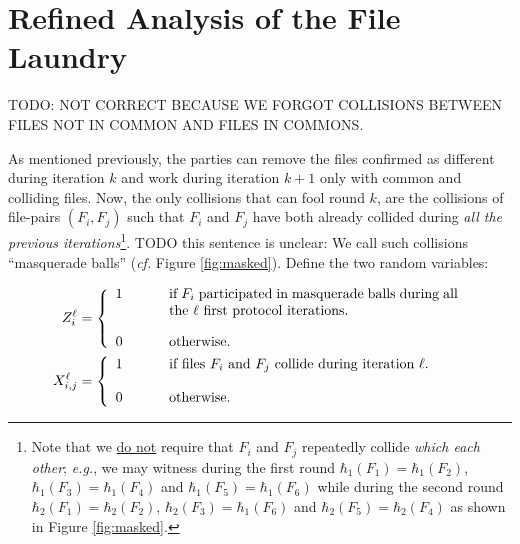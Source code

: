 \documentclass[11pt]{llncs}
\newcommand{\cf}{\textit{cf.}\xspace}
\newcommand{\eg}{\textit{e.g.}\xspace}
\begin{document}
\appendix

\section{Refined Analysis of the File Laundry}
\label{app:refined-file-laundry}

TODO: NOT CORRECT BECAUSE WE FORGOT COLLISIONS BETWEEN FILES NOT IN COMMON AND FILES IN COMMONS.

As mentioned previously, the parties can remove the files confirmed as different during iteration $k$ and work during iteration $k+1$ only with common and colliding files. Now, the only collisions that can fool round $k$, are the collisions of file-pairs $(F_i,F_j)$ such that $F_i$ and $F_j$ have both already collided during \textit{all the previous iterations}\footnote{Note that we \underline{do not} require that $F_i$ and $F_j$ repeatedly collide \textit{which each other}; \eg, we may witness during the first round $\hbar_{1}(F_1)=\hbar_{1}(F_2)$, $\hbar_{1}(F_3)=\hbar_{1}(F_4)$ and $\hbar_{1}(F_5)=\hbar_{1}(F_6)$ while during the second round $\hbar_{2}(F_1)=\hbar_2(F_2)$, $\hbar_{2}(F_3)=\hbar_{1}(F_6)$ and $\hbar_{2}(F_5)=\hbar_{2}(F_4)$ as shown in Figure \ref{fig:masked}.}. TODO this sentence is unclear: We call such collisions ``masquerade balls'' (\cf Figure \ref{fig:masked}). Define the two random variables:

\begin{align*}
Z^\ell_i &=
\left\{
\begin{array}{lcl}
1 & ~~~~&  \parbox[t]{0.6\textwidth}{if $F_i$ participated in masquerade balls during all the $\ell$ first protocol iterations.}\\
\\
0 & ~~~~&  \mbox{otherwise.}
\end{array}
\right. \\
X^{\ell}_{i,j} &=
\left\{
\begin{array}{lcl}
1 & ~~~~&  \parbox[t]{0.6\textwidth}{if files $F_i$ and $F_j$ collide during iteration $\ell$.}\\
\\
0 & ~~~~&  \mbox{otherwise.}
\end{array}
\right.
\end{align*}

\def\bruijn{file $F_1$,file $F_2$,file $F_3$,file $F_4$,file $F_5$,file $F_6$}
\end{document}
